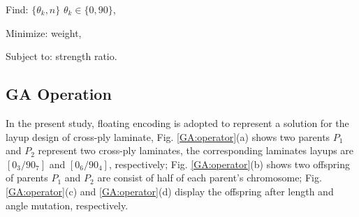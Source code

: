 \documentclass[10pt, journal]{IEEEtran}
\begin{document}
Find: $\{\theta_k, n\}$ $\theta_k \in \{ 0,90\}$,

Minimize: weight,

Subject to: strength ratio.

\subsection{GA Operation}
In the present study, floating encoding is adopted to represent a solution for
the layup design of cross-ply laminate, Fig. \ref{GA:operator}(a) shows two
parents $P_1$ and $P_2$ represent two cross-ply laminates, the
corresponding laminates layups are $[0_3/90_7]$ and $[0_6/90_4]$,
respectively; Fig. \ref{GA:operator}(b) shows two offspring of parents $P_1$
and $P_2$ are consist of half of each parent's chromosome; Fig. 
\ref{GA:operator}(c) and \ref{GA:operator}(d) display the offspring after
length and angle mutation, respectively.
\end{document}
